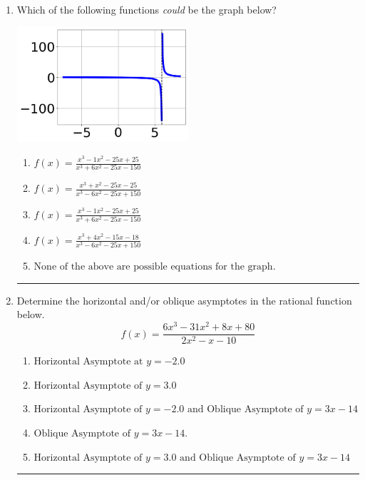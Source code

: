 \documentclass[14pt]{extbook}
\newcommand{\litem}[1]{\item#1\hspace*{-1cm}\rule{\textwidth}{0.4pt}}
\begin{document}
\begin{enumerate}
{\begin{enumerate}[label=\Alph*.]
\end{enumerate} }
\litem{
Which of the following functions \textit{could} be the graph below?
\begin{center}
    \includegraphics[width=0.5\textwidth]{../Figures/identifyGraphOfRationalFunctionCopyB.png}
\end{center}
\begin{enumerate}[label=\Alph*.]
\item \( f(x)=\frac{x^{3} -1 x^{2} -25 x + 25}{x^{3} +6 x^{2} -25 x -150} \)
\item \( f(x)=\frac{x^{3} + x^{2} -25 x -25}{x^{3} -6 x^{2} -25 x + 150} \)
\item \( f(x)=\frac{x^{3} -1 x^{2} -25 x + 25}{x^{3} +6 x^{2} -25 x -150} \)
\item \( f(x)=\frac{x^{3} +4 x^{2} -15 x -18}{x^{3} -6 x^{2} -25 x + 150} \)
\item \( \text{None of the above are possible equations for the graph.} \)

\end{enumerate} }
\litem{
Determine the horizontal and/or oblique asymptotes in the rational function below.\[ f(x) = \frac{6x^{3} -31 x^{2} +8 x + 80}{2x^{2} -x -10} \]\begin{enumerate}[label=\Alph*.]
\item \( \text{Horizontal Asymptote at } y = -2.0 \)
\item \( \text{Horizontal Asymptote of } y = 3.0  \)
\item \( \text{Horizontal Asymptote of } y = -2.0 \text{ and Oblique Asymptote of } y = 3x -14 \)
\item \( \text{Oblique Asymptote of } y = 3x -14. \)
\item \( \text{Horizontal Asymptote of } y = 3.0 \text{ and Oblique Asymptote of } y = 3x -14 \)


\end{enumerate}}
\end{enumerate}
\end{document}
